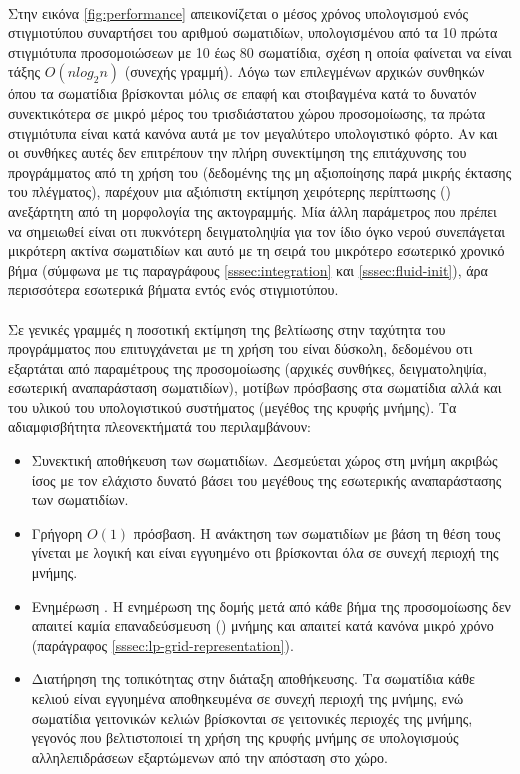 \paragraph{} Στην εικόνα \ref{fig:performance} απεικονίζεται ο μέσος χρόνος υπολογισμού
ενός στιγμιοτύπου  συναρτήσει του αριθμού σωματιδίων, υπολογισμένου από τα 10
πρώτα στιγμιότυπα προσομοιώσεων με 10 έως 80 σωματίδια, σχέση η οποία
φαίνεται να είναι τάξης $O(n log_2n)$ (συνεχής γραμμή). Λόγω των επιλεγμένων αρχικών
συνθηκών όπου τα σωματίδια βρίσκονται μόλις σε επαφή και στοιβαγμένα κατά το δυνατόν
συνεκτικότερα σε μικρό μέρος του τρισδιάστατου χώρου προσομοίωσης, τα πρώτα στιγμιότυπα
είναι κατά κανόνα αυτά με τον μεγαλύτερο υπολογιστικό φόρτο. Αν και οι συνθήκες αυτές δεν
επιτρέπουν την πλήρη συνεκτίμηση της επιτάχυνσης του προγράμματος από τη χρήση του  (δεδομένης της μη αξιοποίησης παρά μικρής έκτασης του πλέγματος), παρέχουν μια
αξιόπιστη εκτίμηση χειρότερης περίπτωσης () ανεξάρτητη από τη μορφολογία
της ακτογραμμής. Μία άλλη παράμετρος που πρέπει να σημειωθεί είναι οτι πυκνότερη
δειγματοληψία για τον ίδιο όγκο νερού συνεπάγεται μικρότερη ακτίνα σωματιδίων και αυτό με
τη σειρά του μικρότερο εσωτερικό χρονικό βήμα (σύμφωνα με τις παραγράφους
\ref{sssec:integration} και \ref{sssec:fluid-init}), άρα περισσότερα εσωτερικά βήματα
εντός ενός στιγμιοτύπου.

\paragraph{} Σε γενικές γραμμές η ποσοτική εκτίμηση της βελτίωσης στην ταχύτητα του
προγράμματος που επιτυγχάνεται με τη χρήση του  είναι δύσκολη, δεδομένου οτι
εξαρτάται από παραμέτρους της προσομοίωσης (αρχικές συνθήκες, δειγματοληψία, εσωτερική
αναπαράσταση σωματιδίων), μοτίβων πρόσβασης στα σωματίδια αλλά και του υλικού του
υπολογιστικού συστήματος (μεγέθος της κρυφής μνήμης). Τα αδιαμφισβήτητα πλεονεκτήματά του
περιλαμβάνουν:
\begin{itemize}
\item Συνεκτική αποθήκευση των σωματιδίων. Δεσμεύεται χώρος στη μνήμη ακριβώς ίσος με τον
  ελάχιστο δυνατό βάσει του μεγέθους της εσωτερικής αναπαράστασης των σωματιδίων.
\item Γρήγορη $Ο(1)$ πρόσβαση. Η ανάκτηση των σωματιδίων με βάση τη θέση τους γίνεται με
  λογική  και είναι εγγυημένο οτι βρίσκονται όλα σε συνεχή περιοχή της
  μνήμης.
\item Ενημέρωση . Η ενημέρωση της δομής μετά από κάθε βήμα της προσομοίωσης
  δεν απαιτεί καμία επαναδεύσμευση () μνήμης και απαιτεί κατά κανόνα
  μικρό χρόνο (παράγραφος \ref{sssec:lp-grid-representation}).
\item Διατήρηση της τοπικότητας στην διάταξη αποθήκευσης. Τα σωματίδια κάθε κελιού είναι
  εγγυημένα αποθηκευμένα σε συνεχή περιοχή της μνήμης, ενώ σωματίδια γειτονικών κελιών
  βρίσκονται σε γειτονικές περιοχές της μνήμης, γεγονός που βελτιστοποιεί τη χρήση της
  κρυφής μνήμης σε υπολογισμούς αλληλεπιδράσεων εξαρτώμενων από την απόσταση στο χώρο.
\end{itemize}

